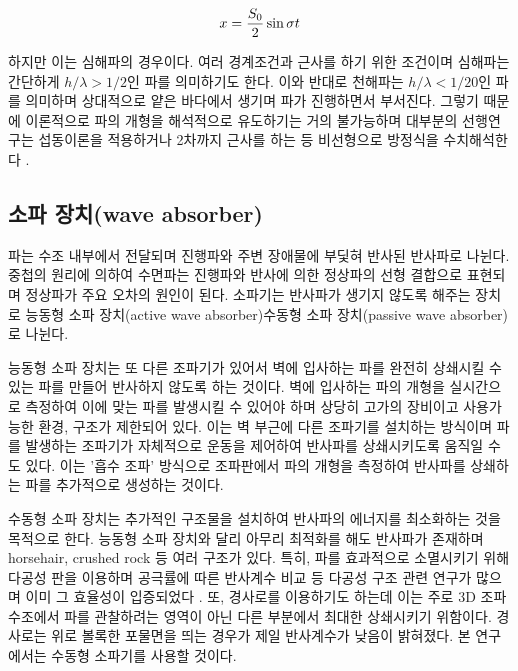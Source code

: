 \begin{equation} \label{eq:7}
{
    x = {{S_0}\over2} \sin{\sigma t}
}
\end{equation}

하지만 이는 심해파의 경우이다. 여러 경계조건과 근사를 하기 위한 조건이며 심해파는 간단하게 $h/\lambda > 1/2$인 파를 의미하기도 한다. 이와 반대로 천해파는 $h/\lambda < 1/20$인 파를 의미하며 상대적으로 얕은 바다에서 생기며 파가 진행하면서 부서진다. 그렇기 때문에 이론적으로 파의 개형을 해석적으로 유도하기는 거의 불가능하며 대부분의 선행연구는 섭동이론을 적용하거나 2차까지 근사를 하는 등 비선형으로 방정식을 수치해석한다 \cite{society1993laboratory}. 

\subsection{소파 장치(wave absorber)}
파는 수조 내부에서 전달되며 진행파와 주변 장애물에 부딫혀 반사된 반사파로 나뉜다. 중첩의 원리에 의하여 수면파는 진행파와 반사에 의한 정상파의 선형 결합으로 표현되며 정상파가 주요 오차의 원인이 된다. 소파기는 반사파가 생기지 않도록 해주는 장치로 능동형 소파 장치(active wave absorber)\와 수동형 소파 장치(passive wave absorber)로 나뉜다\cite{ouellet1986survey}.


능동형 소파 장치는 또 다른 조파기가 있어서 벽에 입사하는 파를 완전히 상쇄시킬 수 있는 파를 만들어 반사하지 않도록 하는 것이다. 벽에 입사하는 파의 개형을 실시간으로 측정하여 이에 맞는 파를 발생시킬 수 있어야 하며 상당히 고가의 장비이고 사용가능한 환경, 구조가 제한되어 있다. 이는 벽 부근에 다른 조파기를 설치하는 방식이며 파를 발생하는 조파기가 자체적으로 운동을 제어하여 반사파를 상쇄시키도록 움직일 수도 있다. 이는 '흡수 조파' 방식으로 조파판에서 파의 개형을 측정하여 반사파를 상쇄하는 파를 추가적으로 생성하는 것이다.


수동형 소파 장치는 추가적인 구조물을 설치하여 반사파의 에너지를 최소화하는 것을 목적으로 한다. 능동형 소파 장치와 달리 아무리 최적화를 해도 반사파가 존재하며 horsehair, crushed rock 등 여러 구조가 있다. 특히, 파를 효과적으로 소멸시키기 위해 다공성 판을 이용하며 공극률에 따른 반사계수 비교 등 다공성 구조 관련 연구가 많으며 이미 그 효율성이 입증되었다\cite{lim2014optimum} \cite{o2017methods}. 또, 경사로를 이용하기도 하는데 이는 주로 3D 조파 수조에서 파를 관찰하려는 영역이 아닌 다른 부분에서 최대한 상쇄시키기 위함이다. 경사로는 위로 볼록한 포물면을 띄는 경우가 제일 반사계수가 낮음이 밝혀졌다. 본 연구에서는 수동형 소파기를 사용할 것이다.

